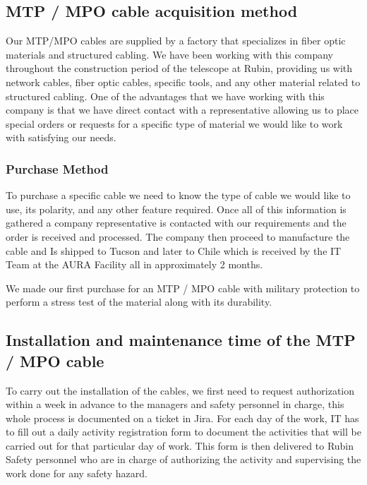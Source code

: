 \subsection{MTP / MPO cable acquisition method}

  Our MTP/MPO cables are supplied by a factory that specializes in fiber optic materials and structured cabling. We have been working with this company throughout the construction period of the telescope at Rubin, providing us with network cables, fiber optic cables, specific tools, and any other material related to structured cabling. One of the advantages that we have working with this company is that we have direct contact with a representative allowing us to place special orders or requests for a specific type of material we would like to work with satisfying our needs.


\subsubsection{Purchase Method}

  To purchase a specific cable we need to know the type of cable we would like to use, its polarity, and any other feature required. Once all of this information is gathered a company representative is contacted with our requirements and the order is received and processed. The company then proceed to manufacture the cable and Is shipped to Tucson and later to Chile which is received by the IT Team at the AURA Facility all in approximately 2 months.

  We made our first purchase for an MTP / MPO cable with military protection to perform a stress test of the material along with its durability.

\subsection{Installation and maintenance time of the MTP / MPO cable}

  To carry out the installation of the cables, we first need to request authorization within a week in advance to the managers and safety personnel in charge, this whole process is documented on a ticket in Jira. For each day of the work, IT has to fill out a daily activity registration form to document the activities that will be carried out for that particular day of work. This form is then delivered to Rubin Safety personnel who are in charge of authorizing the activity and supervising the work done for any safety hazard.

